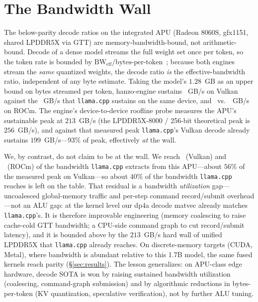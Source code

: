 \documentclass[11pt]{article}
\begin{document}
\section{The Bandwidth Wall}\label{sec:bw}
The below-parity decode ratios on the integrated APU (Radeon 8060S, gfx1151, shared LPDDR5X
via GTT) are memory-bandwidth-bound, not arithmetic-bound. Decode of a dense model streams
the full weight set once per token, so the token rate is bounded by
$\text{BW}_{\text{eff}}/\text{bytes-per-token}$~\cite{roofline2009}; because both engines
stream the \emph{same} quantized weights, the decode ratio \emph{is} the effective-bandwidth
ratio, independent of any byte estimate. Taking the model's \(1.28\)~GB as an upper bound on
bytes streamed per token, hanzo-engine sustains \rVulkanEffBW~GB/s on Vulkan against the
\rVulkanRoofBW~GB/s that \texttt{llama.cpp} sustains on the same device, and \rRocmEffBW\
vs.\ \rRocmRoofBW~GB/s on ROCm. The engine's device-to-device roofline probe measures the
APU's sustainable peak at \(213\)~GB/s (the LPDDR5X-8000 / 256-bit theoretical peak is
\(256\)~GB/s), and against that measured peak \texttt{llama.cpp}'s Vulkan decode already
sustains \(199\)~GB/s---\(93\%\) of peak, effectively \emph{at} the wall.

We, by contrast, do not claim to be at the wall. We reach \rVulkanReach\ (Vulkan) and
\rRocmReach\ (ROCm) of the bandwidth \texttt{llama.cpp} extracts from this APU---about
\(56\%\) of the measured peak on Vulkan---so about \(40\%\) of the bandwidth
\texttt{llama.cpp} reaches is left on the table. That residual is a bandwidth \emph{utilization} gap---uncoalesced
global-memory traffic and per-step command record/submit overhead---not an ALU gap: at the
kernel level our dp4a decode matvec already matches \texttt{llama.cpp}'s. It is therefore
improvable engineering (memory coalescing to raise cache-cold GTT bandwidth; a CPU-side
command graph to cut record/submit latency), and it is bounded above by the \(213\)~GB/s
hard wall of unified LPDDR5X that \texttt{llama.cpp} already reaches. On discrete-memory targets
(CUDA, Metal), where bandwidth is abundant relative to this 1.7B model, the same fused
kernels reach parity (\S\ref{sec:results}). The lesson generalizes: on APU-class edge
hardware, decode SOTA is won by raising sustained bandwidth utilization (coalescing,
command-graph submission) and by algorithmic reductions in bytes-per-token (KV quantization,
speculative verification), not by further ALU tuning.
\end{document}

